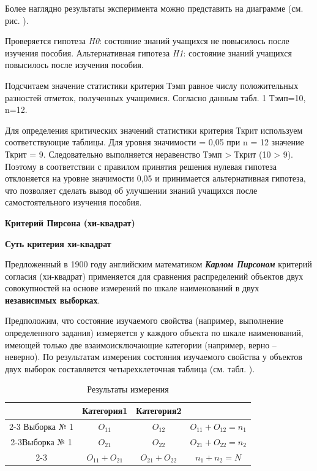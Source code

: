 \documentclass[12pt]{article}
\begin{document}
Более наглядно результаты эксперимента можно представить на диаграмме (см. рис. ).
 
Проверяется гипотеза \textit{H0}: состояние знаний учащихся не повысилось после изучения пособия. Альтернативная гипотеза \textit{H1}: состояние знаний учащихся повысилось после изучения пособия.

Подсчитаем значение статистики критерия Тэмп равное числу положительных разностей отметок, полученных учащимися. Согласно данным табл. 1 Тэмп=10, n=12.

Для определения критических значений статистики критерия Ткрит используем соответствующие таблицы. Для уровня значимости  = 0,05 при n = 12 значение Ткрит = 9. Следовательно выполняется неравенство Тэмп > Ткрит (10 > 9). Поэтому в соответствии с правилом принятия решения нулевая гипотеза отклоняется на уровне значимости 0,05 и принимается альтернативная гипотеза, что позволяет сделать вывод об улучшении знаний учащихся после самостоятельного изучения пособия.

\medskip
\textbf{Критерий Пирсона (хи-квадрат)}

\medskip
\textbf{Суть критерия хи-квадрат}

\medskip
Предложенный в 1900 году английским математиком \textbf{\textit{Карлом Пирсоном}} критерий согласия (хи-квадрат) применяется для сравнения распределений объектов двух совокупностей на основе измерений по шкале наименований в двух \textbf{независимых выборках}.

\bigskip
Предположим, что состояние изучаемого свойства (например, выполнение определенного задания) измеряется у каждого объекта по шкале наименований, имеющей только две взаимоисключающие категории (например, верно – неверно). По результатам измерения состояния изучаемого свойства у объектов двух выборок составляется четырехклеточная таблица (см. табл. ).

\begin{table}[h]
    \centering
    \caption{Результаты измерения}
    \bigskip
    \begin{tabular}{c|c|c|c} 
         &Категория1&Категория2&  \\
         \cline{2-3} Выборка № 1&\textit{$O_{11}$}&\textit{$O_{12}$}&\textit{$O_{11} + O_{12} = n_1$} \\
         \cline{2-3}Выборка № 1&\textit{$O_{21}$}&\textit{$O_{22}$}&\textit{$O_{21} + O_{22} = n_2$} \\
         \cline{2-3}&\textit{$O_{11} + O_{21}$}&\textit{$O_{21} + O_{22}$}&\textit{$n_1 + n_2 = N$}  \\
    \end{tabular}
\end{table}
 
\end{document}

